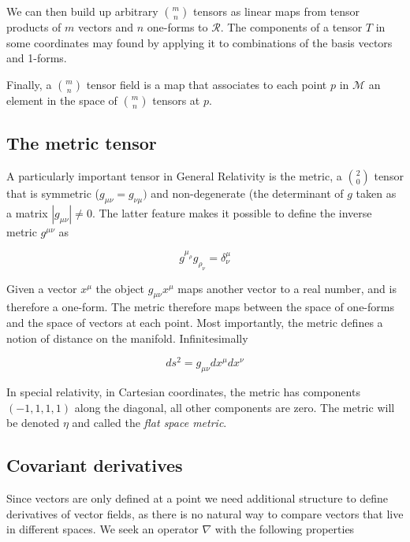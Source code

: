 We can then build up arbitrary ${m \choose n}$ tensors as linear maps
from tensor products of $m$ vectors and $n$ one-forms to
$\mathcal{R}$.  The components of a tensor $T$ in some coordinates may
found by applying it to combinations of the basis vectors and 1-forms.


Finally, a ${m \choose n}$ tensor field is a map that associates to
each point $p$ in $\mathcal{M}$ an element in the space of  ${m
\choose n}$ tensors at $p$.

\subsection{The metric tensor}

A particularly important tensor in General Relativity is the metric, a
${2 \choose 0}$ tensor that is symmetric ($g_{\mu\nu} = g_{\nu\mu})$
and non-degenerate (the determinant of $g$ taken as a matrix
$|g_{\mu\nu}| \neq 0$.  The latter feature makes it possible to
define the inverse metric $g^{\mu\nu}$ as

\begin{equation*}
g^{\mu_\rho} g_{\rho_\nu} = \delta^\mu_\nu
\end{equation*}

Given a vector $x^\mu$ the object $g_{\mu\nu} x^\mu$ maps another
vector to a real number, and is therefore a one-form.  The metric
therefore maps between the space of one-forms and the space of vectors
at each point.  Most importantly, the metric defines a notion of
distance on the manifold.  Infinitesimally

\begin{equation}
ds^2 = g_{\mu\nu} dx^\mu dx^\nu
\end{equation}

In special relativity, in Cartesian coordinates, the metric has
components $(-1,1,1,1)$ along the diagonal, all other components are
zero.   The metric will be denoted $\eta$ and called the \emph{flat
space metric}.

\subsection{Covariant derivatives}

Since vectors are only defined at a point we need additional structure
to define derivatives of vector fields, as there is no natural way to
compare vectors that live in different spaces.  We seek an operator
$\nabla$ with the following properties

